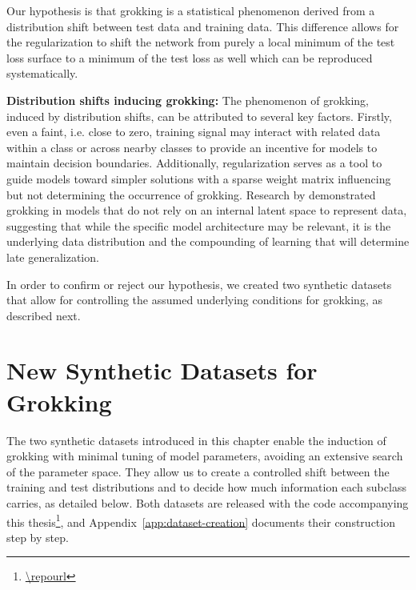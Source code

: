 ﻿\documentclass[../ppgc-tese.tex]{subfiles}
\begin{document}
Our hypothesis is that grokking is a statistical phenomenon derived from a distribution shift between test data and training data. This difference allows for the regularization to shift the network from purely a local minimum of the test loss surface to a minimum of the test loss as well which can be reproduced systematically.

\textbf{Distribution shifts inducing grokking:}
The phenomenon of grokking, induced by distribution shifts, can be attributed to several key factors.
Firstly, even a faint, i.e. close to zero, training signal may interact with related data within a class or across nearby classes to provide an incentive for models to maintain decision boundaries.
Additionally, regularization serves as a tool to guide models toward simpler solutions with a sparse weight matrix influencing but not determining the occurrence of grokking.
Research by \cite{Grokking} demonstrated grokking in models that do not rely on an internal latent space to represent data, suggesting that while the specific model architecture may be relevant, it is the underlying data distribution and the compounding of learning that will determine late generalization.


In order to confirm or reject our hypothesis, we created two synthetic datasets that allow for controlling the assumed underlying conditions for grokking, as described next. 



\section{New Synthetic Datasets for Grokking}\label{sec:artificial-datasets}

The two synthetic datasets introduced in this chapter enable the induction of grokking with minimal tuning of model parameters, avoiding an extensive search of the parameter space. They allow us to create a controlled shift between the training and test distributions and to decide how much information each subclass carries, as detailed below. Both datasets are released with the code accompanying this thesis\footnote{\url{\repourl}}, and Appendix~\ref{app:dataset-creation} documents their construction step by step.
\end{document}
